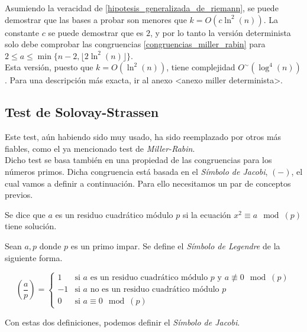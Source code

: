Asumiendo la veracidad de \autoref{hipotesis_generalizada_de_riemann}, se puede demostrar que las bases a probar son menores que $k = O(c\ln^2(n))$. La constante $c$ se puede demostrar que es $2$, y por lo tanto la versión determinista solo debe comprobar las congruencias \eqref{congruencias_miller_rabin} para $2 \leq a \leq \min\{n-2, \lfloor 2\ln^2(n) \rfloor\}$.\\

Esta versión, puesto que $k = O(\ln^2(n))$, tiene complejidad $O^\sim(\log^4(n))$. Para una descripción más exacta, ir al anexo <anexo miller determinista>.

\subsection{Test de Solovay-Strassen}

Este test, aún habiendo sido muy usado, ha sido reemplazado por otros más fiables, como el ya mencionado test de \textit{Miller-Rabin}.\\

Dicho test se basa también en una propiedad de las congruencias para los números primos. Dicha congruencia está basada en el \textit{Símbolo de Jacobi}, $(-)$, el cual vamos a definir a continuación. Para ello necesitamos un par de conceptos previos.

\begin{definicion}
	Se dice que $a$ es un residuo cuadrático módulo $p$ si la ecuación $x^2 \equiv a \mod(p)$ tiene solución.
\end{definicion}

\begin{definicion}\label{simbolo_de_legendre}
	Sean $a, p$ donde $p$ es un primo impar. Se define el \textit{Símbolo de Legendre} de la siguiente forma.
	
	\begin{equation}
	\left(\frac{a}{p}\right) =
	\begin{cases}
		1 &\text{si $a$ es un residuo cuadrático módulo $p$ y $a \not\equiv 0 \mod(p)$}\\
		-1 &\text{si $a$ no es un residuo cuadrático módulo $p$}\\
		0 &\text{si $a \equiv 0 \mod(p)$}
	\end{cases}
	\end{equation}
\end{definicion}

Con estas dos definiciones, podemos definir el \textit{Símbolo de Jacobi}.

